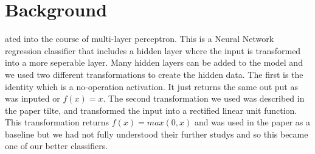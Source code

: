 
\section{Background}
\label{sec:background}

ated into the course of multi-layer perceptron. This is a
Neural Network regression classifier that includes a hidden layer
where the input is transformed into a more seperable layer. Many
hidden layers can be added to the model and we used two different
transformations to create the hidden data. The first is the identity
which is a no-operation activation. It just returns the same out put
as was inputed or $f(x)=x$. The second transformation we used was
described in the paper tilte,
and transformed the input into a rectified linear unit function.\cite{milgram} This
transformation returns $f(x)=max(0,x)$ and was used in the paper as a
baseline but we had not fully understood their further studys and so
this became one of our better classifiers. \\




